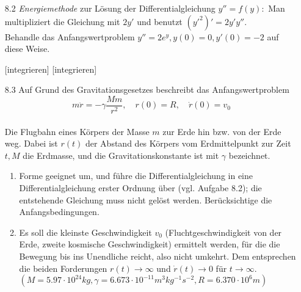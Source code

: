 \documentclass{HM}
\begin{document}
	\begin{enumerate}
		\item[8.2] \textit{Energiemethode} zur Lösung der Differentialgleichung $y''=f(y):$ Man multipliziert die Gleichung mit $2y'$ und benutzt $(y'^2)'=2y'y''$.\\
		Behandle das Anfangswertproblem $y''=2e^y, y(0)=0, y'(0)=-2$ auf diese Weise.
		\begin{eqnn}
			[integrieren]
			[integrieren]
		\end{eqnn}
		
		\item[8.3] Auf Grund des Gravitationsgesetzes beschreibt das Anfangswertproblem\\
		$$m\ddot{r}=-\gamma\frac{Mm}{r^2},\quad r(0)=R, \quad \dot{r}(0)=v_0$$\\
		Die Flugbahn eines Körpers der Masse $m$ zur Erde hin bzw. von der Erde weg. Dabei ist $r(t)$ der Abstand des Körpers vom Erdmittelpunkt zur Zeit $t, M$ die Erdmasse, und die Gravitationskonstante ist mit $\gamma$ bezeichnet.
		\begin{enumerate}
			\item Forme geeignet um, und führe die Differentialgleichung in eine Differentialgleichung erster Ordnung über (vgl. Aufgabe 8.2); die entstehende Gleichung muss nicht gelöst werden. Berücksichtige die Anfangsbedingungen.
			
			\item Es soll die kleinste Geschwindigkeit $v_0$ (Fluchtgeschwindigkeit von der Erde, zweite kosmische Geschwindigkeit) ermittelt werden, für die die Bewegung bis ins Unendliche reicht, also nicht umkehrt. Dem entsprechen die beiden Forderungen $r(t)\to\infty$ und $\dot{r}(t)\to 0$ für $t\to\infty$.\\
			$(M=5.97\cdot 10^{24}kg, \gamma=6.673\cdot 10^{-11}m^3kg^{-1}s^{-2}, R=6.370\cdot 10^6m)$
			

\end{enumerate}
\end{enumerate}
\end{document}
